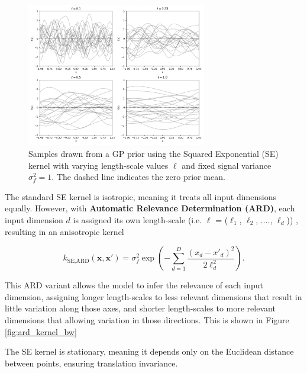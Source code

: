 \documentclass{ut-thesis}
\begin{document}
\begin{figure}[htbp]
    \centering
    \includegraphics[width=0.7\textwidth]{rbf.png}
    \caption[Samples drawn from a Gaussian Process prior using the Squared Exponential kernel 
    with varying length-scale values \( \ell \) and fixed signal variance \( \sigma_f^2 = 1 \).]{Samples drawn from a GP prior using the Squared Exponential (SE) kernel 
    with varying length-scale values \( \ell \) and fixed signal variance \( \sigma_f^2 = 1 \). The dashed line indicates the zero prior mean.}
    \label{fig:gp_samples}
\end{figure}

\newpage
The standard SE kernel is isotropic, meaning it treats all input dimensions equally. However, with \textbf{Automatic Relevance Determination (ARD)}, each input dimension \( d \) is assigned its own length-scale (i.e. $\ell$  = ($\ell_1$, $\ell_2$, ...., $\ell_d$)) , resulting in an anisotropic kernel

\begin{equation}
    k_{\text{SE,ARD}}(\mathbf{x}, \mathbf{x'}) = \sigma_f^2 \exp\left( -\sum_{d=1}^{D} \frac{(x_d - x'_d)^2}{2\ell_d^2} \right).
\end{equation}

This ARD variant allows the model to infer the relevance of each input dimension, assigning longer length-scales to less relevant dimensions that result in little variation along those axes, and shorter length-scales to more relevant dimensions that allowing variation in those directions. This is shown in Figure \ref{fig:ard_kernel_bw}

The SE kernel is stationary, meaning it depends only on the Euclidean distance between points, ensuring translation invariance.
\end{document}
